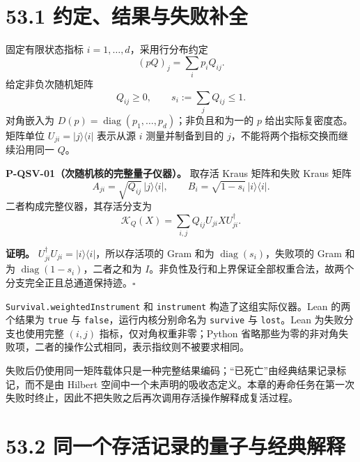 \documentclass[
  11pt,
  oneside]{book}
\begin{document}
\hypertarget{ux7ea6ux5b9aux7ed3ux679cux4e0eux5931ux8d25ux8865ux5168}{%
\section{53.1
约定、结果与失败补全}\label{ux7ea6ux5b9aux7ed3ux679cux4e0eux5931ux8d25ux8865ux5168}}

固定有限状态指标 \(i=1,\ldots,d\)，采用行分布约定 \[
(pQ)_j=\sum_i p_iQ_{ij}.
\] 给定非负次随机矩阵 \[
Q_{ij}\ge0,\qquad s_i:=\sum_jQ_{ij}\le1.
\] 对角嵌入为
\(D(p)=\operatorname{diag}(p_1,\ldots,p_d)\)；非负且和为一的 \(p\)
给出实际复密度态。矩阵单位 \(U_{ji}=|j\rangle\langle i|\) 表示从源 \(i\)
测量并制备到目的 \(j\)，不能将两个指标交换而继续沿用同一 \(Q\)。

\protect\hypertarget{p-qsv-01}{}{}

\textbf{P-QSV-01（次随机核的完整量子仪器）。} 取存活 Kraus 矩阵和失败
Kraus 矩阵 \[
A_{ji}=\sqrt{Q_{ij}}\,|j\rangle\langle i|,
\qquad B_i=\sqrt{1-s_i}\,|i\rangle\langle i|.
\] 二者构成完整仪器，其存活分支为 \[
\mathcal K_Q(X)=\sum_{i,j}Q_{ij}U_{ji}XU_{ji}^{\dagger}.
\]

\textbf{证明。}
\(U_{ji}^{\dagger}U_{ji}=|i\rangle\langle i|\)，所以存活项的 Gram 和为
\(\operatorname{diag}(s_i)\)，失败项的 Gram 和为
\(\operatorname{diag}(1-s_i)\)，二者之和为
\(I\)。非负性及行和上界保证全部权重合法，故两个分支完全正且总通道保持迹。\(\square\)

\texttt{Survival.weightedInstrument} 和 \texttt{instrument}
构造了这组实际仪器。Lean 的两个结果为 \texttt{true} 与
\texttt{false}，运行内核分别命名为 \texttt{survive} 与
\texttt{lost}。Lean 为失败分支也使用完整 \((i,j)\)
指标，仅对角权重非零；Python
省略那些为零的非对角失败项，二者的操作公式相同，表示指纹则不被要求相同。

失败后仍使用同一矩阵载体只是一种完整结果编码；``已死亡''由经典结果记录标记，而不是由
Hilbert
空间中一个未声明的吸收态定义。本章的寿命任务在第一次失败时终止，因此不把失败之后再次调用存活操作解释成复活过程。

\hypertarget{ux540cux4e00ux4e2aux5b58ux6d3bux8bb0ux5f55ux7684ux91cfux5b50ux4e0eux7ecfux5178ux89e3ux91ca}{%
\section{53.2
同一个存活记录的量子与经典解释}\label{ux540cux4e00ux4e2aux5b58ux6d3bux8bb0ux5f55ux7684ux91cfux5b50ux4e0eux7ecfux5178ux89e3ux91ca}}

\protect\hypertarget{p-qsv-02}{}{}
\end{document}
